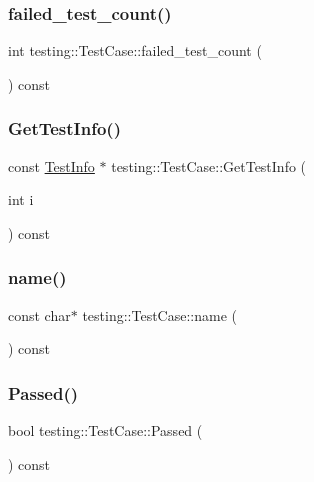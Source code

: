 \subsubsection{\texorpdfstring{failed\_test\_count()}{failed\_test\_count()}}
{\footnotesize\ttfamily int testing\+::\+Test\+Case\+::failed\+\_\+test\+\_\+count (\begin{DoxyParamCaption}{ }\end{DoxyParamCaption}) const}

\mbox{\label{classtesting_1_1TestCase_a441e0eca232643671dc365c2924c255c}} 
\subsubsection{\texorpdfstring{GetTestInfo()}{GetTestInfo()}}
{\footnotesize\ttfamily const \mbox{\hyperlink{classtesting_1_1TestInfo}{Test\+Info}} $\ast$ testing\+::\+Test\+Case\+::\+Get\+Test\+Info (\begin{DoxyParamCaption}\item[{int}]{i }\end{DoxyParamCaption}) const}

\mbox{\label{classtesting_1_1TestCase_a3f1beb98d5f7e3b037a4ec82b64cc1cf}} 
\subsubsection{\texorpdfstring{name()}{name()}}
{\footnotesize\ttfamily const char$\ast$ testing\+::\+Test\+Case\+::name (\begin{DoxyParamCaption}{ }\end{DoxyParamCaption}) const\hspace{0.3cm}{\ttfamily [inline]}}

\mbox{\label{classtesting_1_1TestCase_a29bbfd227b732a90198b5280c039c271}} 
\subsubsection{\texorpdfstring{Passed()}{Passed()}}
{\footnotesize\ttfamily bool testing\+::\+Test\+Case\+::\+Passed (\begin{DoxyParamCaption}{ }\end{DoxyParamCaption}) const\hspace{0.3cm}{\ttfamily [inline]}}

